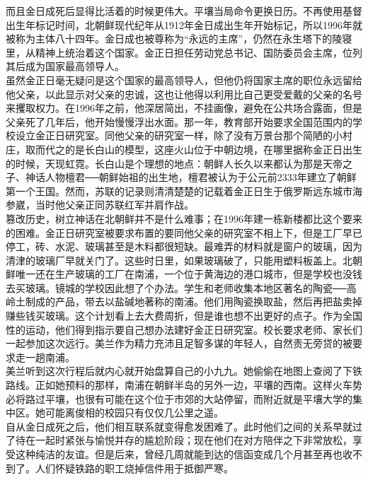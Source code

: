 而且金日成死后显得比活着的时候更伟大。平壤当局命令更换日历。不再使用基督出生年标记时间，北朝鲜现代纪年从1912年金日成出生年开始标记，所以1996年就被称为主体八十四年。金日成也被尊称为“永远的主席”，仍然在永生塔下的陵寝里，从精神上统治着这个国家。金正日担任劳动党总书记、国防委员会主席，位列其后成为国家最高领导人。\\

虽然金正日毫无疑问是这个国家的最高领导人，但他仍将国家主席的职位永远留给他父亲，以此显示对父亲的忠诚，这也让他得以利用比自己更受爱戴的父亲的名号来攫取权力。在1996年之前，他深居简出，不挂画像，避免在公共场合露面，但是父亲死了几年后，他开始慢慢浮出水面。那一年，教育部开始要求全国范围内的学校设立金正日研究室。同他父亲的研究室一样，除了没有万景台那个简陋的小村庄，取而代之的是长白山的模型，这座火山位于中朝边境，在哪里据称金正日出生的时候，天现虹霓。长白山是个理想的地点：朝鲜人长久以来都认为那是天帝之子、神话人物檀君──朝鲜始祖的出生地，檀君被认为于公元前2333年建立了朝鲜第一个王国。然而，苏联的记录则清清楚楚的记载着金正日生于俄罗斯远东城市海参崴，当时他父亲正同苏联红军并肩作战。\\

篡改历史，树立神话在北朝鲜并不是什么难事；在1996年建一栋新楼都比这个要来的困难。金正日研究室被要求布置的要同他父亲的研究室不相上下，但是工厂早已停工，砖、水泥、玻璃甚至是木料都很短缺。最难弄的材料就是窗户的玻璃，因为清津的玻璃厂早就关门了。这些时日里，如果玻璃破了，只能用塑料板盖上。北朝鲜唯一还在生产玻璃的工厂在南浦，一个位于黄海边的港口城市，但是学校也没钱去买玻璃。镜城的学校因此想了个办法。学生和老师收集本地区著名的陶瓷──高岭土制成的产品，带去以盐碱地著称的南浦。他们用陶瓷换取盐，然后再把盐卖掉赚些钱买玻璃。这个计划看上去大费周折，但是谁也想不出更好的点子。作为全国性的运动，他们得到指示要自己想办法建好金正日研究室。校长要求老师、家长们一起参加这次远行。美兰作为精力充沛且足智多谋的年轻人，自然责无旁贷的被要求走一趟南浦。\\

美兰听到这次行程后就内心就开始盘算自己的小九九。她偷偷在地图上查阅了下铁路线。正如她预料的那样，南浦在朝鲜半岛的另外一边，平壤的西南。这样火车势必将路过平壤，也很有可能在这个位于市郊的大站停留，而附近就是平壤大学的集中区。她可能离俊相的校园只有仅仅几公里之遥。\\

自从金日成死之后，他们相互联系就变得愈发困难了。此时他们之间的关系早就过了待在一起时紧张与愉悦并存的尴尬阶段；现在他们在对方陪伴之下非常放松，享受这种纯洁的友谊。但是后来，曾经几周就能到达的信函变成几个月甚至再也收不到了。人们怀疑铁路的职工烧掉信件用于抵御严寒。\\

